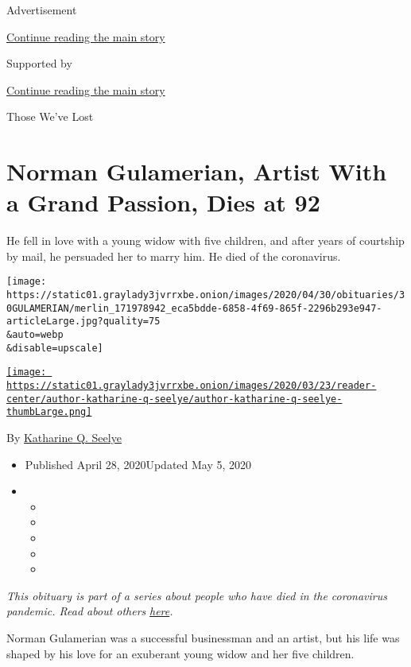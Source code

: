 Advertisement

\protect\hyperlink{after-top}{Continue reading the main story}

Supported by

\protect\hyperlink{after-sponsor}{Continue reading the main story}

Those We've Lost

\hypertarget{norman-gulamerian-artist-with-a-grand-passion-dies-at-92}{%
\section{Norman Gulamerian, Artist With a Grand Passion, Dies at
92}\label{norman-gulamerian-artist-with-a-grand-passion-dies-at-92}}

He fell in love with a young widow with five children, and after years
of courtship by mail, he persuaded her to marry him. He died of the
coronavirus.

\texttt{[image: https://static01.graylady3jvrrxbe.onion/images/2020/04/30/obituaries/30GULAMERIAN/merlin\_171978942\_eca5bdde-6858-4f69-865f-2296b293e947-articleLarge.jpg?quality=75\\\&auto=webp\\\&disable=upscale]}

\href{https://www.nytimes3xbfgragh.onion/by/katharine-q-seelye}{\texttt{[image: https://static01.graylady3jvrrxbe.onion/images/2020/03/23/reader-center/author-katharine-q-seelye/author-katharine-q-seelye-thumbLarge.png]}}

By
\href{https://www.nytimes3xbfgragh.onion/by/katharine-q-seelye}{Katharine
Q. Seelye}

\begin{itemize}
\item
  Published April 28, 2020Updated May 5, 2020
\item
  \begin{itemize}
  \item
  \item
  \item
  \item
  \item
  \end{itemize}
\end{itemize}

\emph{This obituary is part of a series about people who have died in
the coronavirus pandemic. Read about others}
\href{https://www.nytimes3xbfgragh.onion/series/people-who-have-died-of-the-coronavirus}{\emph{here}}\emph{.}

Norman Gulamerian was a successful businessman and an artist, but his
life was shaped by his love for an exuberant young widow and her five
children.

